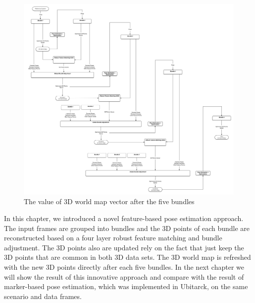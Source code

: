 \begin{figure}[H]
  \centering
  \includegraphics[width=150mm]{figures/mapping}
  \caption{The value of 3D world map vector after the five bundles}\label{fig:mapping_concept}
\end{figure}

In this chapter, we introduced a novel feature-based pose estimation approach. The input frames are grouped into bundles and the 3D points of each bundle are reconstructed based on a four layer robust feature matching and bundle adjustment. The 3D points also are updated rely on the fact that just keep the 3D points that are common in both 3D data sets. The 3D world map is refreshed with the new 3D points directly after each five bundles. In the next chapter we will show the result of this innovative approach and compare with the result of marker-based pose estimation, which was implemented in Ubitarck, on the same scenario and data frames.
